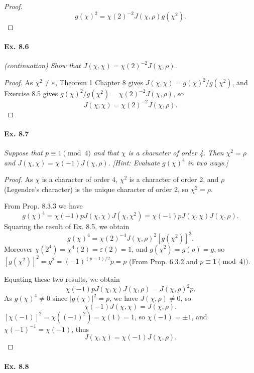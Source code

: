\documentclass[11pt,a4paper]{article}
\begin{document}
{\begin{proof}
$$g(\chi)^2 = \chi(2)^{-2}  J(\chi,\rho) g(\chi^2).$$
\end{proof}

\paragraph{Ex. 8.6}

{\it (continuation) Show that $J(\chi,\chi) = \chi(2)^{-2} J(\chi,\rho)$.

}

\begin{proof}
As $\chi^2 \ne \varepsilon$, Theorem 1 Chapter 8 gives $J(\chi,\chi) = g(\chi)^2/g(\chi^2)$, and Exercise 8.5 gives $g(\chi)^2/g(\chi^2) = \chi(2)^{-2} J(\chi,\rho)$, so
$$J(\chi,\chi) =  \chi(2)^{-2} J(\chi,\rho).$$
\end{proof}

\paragraph{Ex. 8.7}

{\it Suppose that $p\equiv 1 \pmod 4$ and that $\chi$ is a character of order 4. Then $\chi^2 = \rho$ and $J(\chi,\chi) = \chi(-1) J(\chi,\rho)$. [Hint: Evaluate $g(\chi)^4$ in two ways.]

}

\begin{proof}
As $\chi$ is a character of order 4, $\chi^2$ is a character of order 2, and $\rho$ (Legendre's character) is the unique character of order 2, so $\chi^2 = \rho$.

From Prop. 8.3.3 we have
$$g(\chi)^4 = \chi(-1) p J(\chi,\chi) J(\chi,\chi^2)  =  \chi(-1) p J(\chi,\chi) J(\chi,\rho).$$
Squaring the result of Ex. 8.5, we obtain
$$g(\chi)^4 = \chi(2)^{-4} J(\chi,\rho)^2 \left[g(\chi^2)\right]^2.$$
Moreover $\chi(2^4) = \chi^4(2) = \varepsilon(2) = 1$, and $g(\chi^2) = g(\rho) = g$, so $\left[g(\chi^2)\right]^2=g^2 = (-1)^{(p-1)/2} p = p $ (From Prop. 6.3.2 and $p\equiv 1 \pmod 4)$. 

Equating these two results, we obtain 
$$\chi(-1) p J(\chi,\chi) J(\chi,\rho)= J(\chi,\rho)^2 p.$$
As $g(\chi)^4 \ne 0$ since $|g(\chi)|^2 = p$, we have $J(\chi,\rho) \ne 0$, so
$$\chi(-1) J(\chi,\chi) = J(\chi,\rho).$$
$[\chi(-1)]^2 = \chi((-1)^2) = \chi(1) = 1$, so $\chi(-1) = \pm 1$, and $\chi(-1)^{-1} = \chi(-1)$, thus
$$ J(\chi,\chi) = \chi(-1) J(\chi,\rho).$$
\end{proof}

\paragraph{Ex. 8.8}

}
\end{document}
